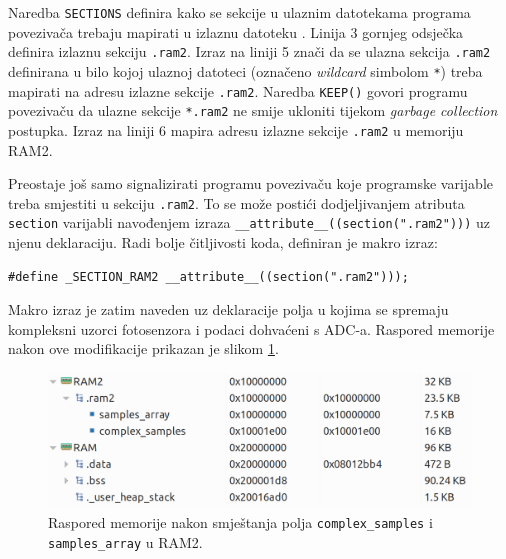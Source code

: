 Naredba \texttt{SECTIONS} definira kako se sekcije u ulaznim datotekama programa povezivača trebaju mapirati u izlaznu datoteku \cite{ld_dokumentacija}. Linija 3 gornjeg odsječka definira izlaznu sekciju \texttt{.ram2}. Izraz na liniji 5 znači da se ulazna sekcija \texttt{.ram2} definirana u bilo kojoj ulaznoj datoteci (označeno \textit{wildcard} simbolom \texttt{*}) treba mapirati na adresu izlazne sekcije \texttt{.ram2}. Naredba \texttt{KEEP()} govori programu povezivaču da ulazne sekcije \texttt{*.ram2} ne smije ukloniti tijekom \textit{garbage collection} postupka. Izraz na liniji 6 mapira adresu izlazne sekcije \texttt{.ram2} u memoriju RAM2.

Preostaje još samo signalizirati programu povezivaču koje programske varijable treba smjestiti u sekciju \texttt{.ram2}. To se može postići dodjeljivanjem atributa \texttt{section} varijabli navođenjem izraza \texttt{\_\_attribute\_\_((section(".ram2")))} uz njenu deklaraciju. Radi bolje čitljivosti koda, definiran je makro izraz:

\begin{lstlisting}
#define _SECTION_RAM2 __attribute__((section(".ram2")));
\end{lstlisting}

Makro izraz je zatim naveden uz deklaracije polja u kojima se spremaju kompleksni uzorci fotosenzora i podaci dohvaćeni s ADC-a. Raspored memorije nakon ove modifikacije prikazan je slikom \ref{fig:memorija}.

\begin{figure}[htb]
    \centering
    \includegraphics[width=\textwidth]{slike/memorija.png}
    \caption{Raspored memorije nakon smještanja polja \texttt{complex\_samples} i \texttt{samples\_array} u RAM2.}
    \label{fig:memorija}
\end{figure}